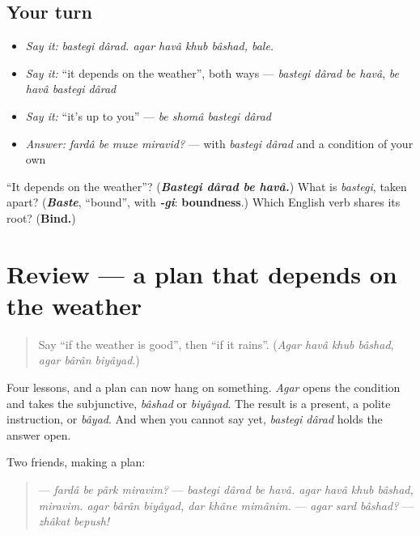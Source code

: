 \subsection*{Your turn}
\begin{itemize}
\raggedright
  \item \emph{Say it:} \emph{bastegi dârad. agar havâ khub bâshad, bale.}
  \item \emph{Say it:} \textquotedblleft{}it depends on the weather\textquotedblright{}, both ways — \emph{bastegi dârad be havâ}, \emph{be havâ bastegi dârad}
  \item \emph{Say it:} \textquotedblleft{}it's up to you\textquotedblright{} — \emph{be shomâ bastegi dârad}
  \item \emph{Answer:} \emph{fardâ be muze miravid?} — with \emph{bastegi dârad} and a condition of your own
\end{itemize}

\begin{tcolorbox}[breakable,colback=teal!4,colframe=teal!35!black,title={Before you move on}]
\textquotedblleft{}It depends on the weather\textquotedblright{}? (\emph{\textbf{Bastegi dârad be havâ.}}) What is \emph{bastegi}, taken apart? (\emph{\textbf{Baste}}, \textquotedblleft{}bound\textquotedblright{}, with \emph{\textbf{-gi}}: \textbf{boundness}.) Which English verb shares its root? (\textbf{Bind.})
\end{tcolorbox}
\section[(review)]{Review — a plan that depends on the weather}

\label{lesson:FA-R298-if-and-it-depends}



\begin{quote}
Say \textquotedblleft{}if the weather is good\textquotedblright{}, then \textquotedblleft{}if it rains\textquotedblright{}. (\emph{Agar havâ khub bâshad}, \emph{agar bârân biyâyad}.)
\end{quote}

\begin{grammarlens}[title={What you've built}]
Four lessons, and a plan can now hang on something. \emph{Agar} opens the condition and takes the subjunctive, \emph{bâshad} or \emph{biyâyad}. The result is a present, a polite instruction, or \emph{bâyad}. And when you cannot say yet, \emph{bastegi dârad} holds the answer open.

Two friends, making a plan:

\begin{quote}
— \emph{fardâ be pârk miravim?} — \emph{bastegi dârad be havâ. agar havâ khub bâshad, miravim. agar bârân biyâyad, dar khâne mimânim.} — \emph{agar sard bâshad?} — \emph{zhâkat bepush!}
\end{quote}
\end{grammarlens}

